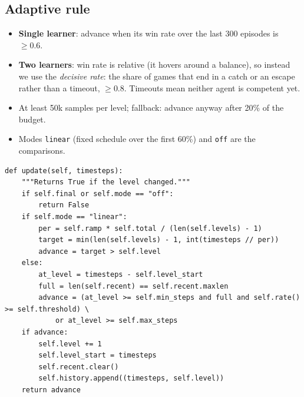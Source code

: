 \documentclass[11pt,a4paper]{article}
\newcommand{\code}[1]{\texttt{#1}}
\begin{document}
\subsection{Adaptive rule}
\begin{itemize}
  \item \textbf{Single learner}: advance when its win rate over the last 300 episodes is $\ge0.6$.
  \item \textbf{Two learners}: win rate is relative (it hovers around a balance), so instead we use
        the \emph{decisive rate}: the share of games that end in a catch or an escape rather than a
        timeout, $\ge0.8$. Timeouts mean neither agent is competent yet.
  \item At least 50k samples per level; fallback: advance anyway after 20\% of the budget.
  \item Modes \code{linear} (fixed schedule over the first 60\%) and \code{off} are the comparisons.
\end{itemize}
\begin{lstlisting}[title={\code{rl/curriculum.py} -- Curriculum.update (exact)}]
def update(self, timesteps):
    """Returns True if the level changed."""
    if self.final or self.mode == "off":
        return False
    if self.mode == "linear":
        per = self.ramp * self.total / (len(self.levels) - 1)
        target = min(len(self.levels) - 1, int(timesteps // per))
        advance = target > self.level
    else:
        at_level = timesteps - self.level_start
        full = len(self.recent) == self.recent.maxlen
        advance = (at_level >= self.min_steps and full and self.rate() >= self.threshold) \
            or at_level >= self.max_steps
    if advance:
        self.level += 1
        self.level_start = timesteps
        self.recent.clear()
        self.history.append((timesteps, self.level))
    return advance
\end{lstlisting}

\end{document}
